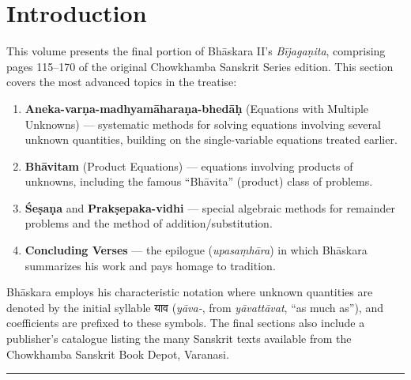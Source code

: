 \documentclass[11pt,a4paper]{article}
\newcommand{\longline}{\noindent\rule{\textwidth}{0.4pt}}
\newcommand{\dev}[1]{{\devanagarifont #1}}
\begin{document}
\tableofcontents
\newpage

\section*{Introduction}

This volume presents the final portion of Bhāskara II's \textit{Bījagaṇita}, comprising pages 115--170 of the original Chowkhamba Sanskrit Series edition. This section covers the most advanced topics in the treatise:

\begin{enumerate}[label=\arabic*.]
  \item \textbf{Aneka-varṇa-madhyamāharaṇa-bhedāḥ} (Equations with Multiple Unknowns) --- systematic methods for solving equations involving several unknown quantities, building on the single-variable equations treated earlier.
  
  \item \textbf{Bhāvitam} (Product Equations) --- equations involving products of unknowns, including the famous ``Bhāvita'' (product) class of problems.
  
  \item \textbf{Śeṣaṇa} and \textbf{Prakṣepaka-vidhi} --- special algebraic methods for remainder problems and the method of addition/substitution.
  
  \item \textbf{Concluding Verses} --- the epilogue (\textit{upasaṃhāra}) in which Bhāskara summarizes his work and pays homage to tradition.
\end{enumerate}

Bhāskara employs his characteristic notation where unknown quantities are denoted by the initial syllable \dev{याव} (\textit{yāva-}, from \textit{yāvattāvat}, ``as much as''), and coefficients are prefixed to these symbols. The final sections also include a publisher's catalogue listing the many Sanskrit texts available from the Chowkhamba Sanskrit Book Depot, Varanasi.

\longline

\end{document}
